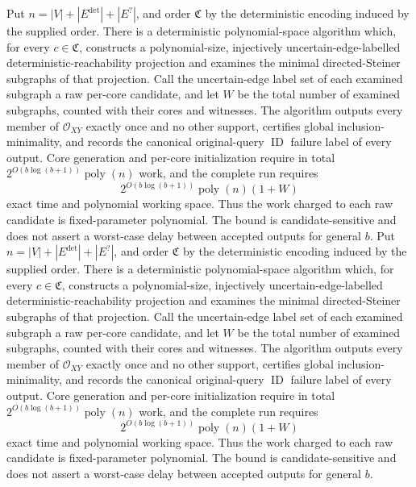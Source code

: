 Put \(n=|V|+|E^{\mathrm{det}}|+|E^{?}|\), and order \(\mathfrak C\) by the deterministic encoding induced by the supplied order.  There is a deterministic polynomial-space algorithm which, for every \(c\in\mathfrak C\), constructs a polynomial-size, injectively uncertain-edge-labelled deterministic-reachability projection and examines the minimal directed-Steiner subgraphs of that projection.  Call the uncertain-edge label set of each examined subgraph a raw per-core candidate, and let \(W\) be the total number of examined subgraphs, counted with their cores and witnesses.  The algorithm outputs every member of \(\mathcal O_{XY}\) exactly once and no other support, certifies global inclusion-minimality, and records the canonical original-query \(\operatorname{ID}\) failure label of every output.  Core generation and per-core initialization require in total \(2^{O(b\log(b+1))}\operatorname{poly}(n)\) work, and the complete run requires
\[
 2^{O(b\log(b+1))}\operatorname{poly}(n)(1+W)
\]
exact time and polynomial working space.  Thus the work charged to each raw candidate is fixed-parameter polynomial.  The bound is candidate-sensitive and does not assert a worst-case delay between accepted outputs for general \(b\).
Put \(n=|V|+|E^{\mathrm{det}}|+|E^{?}|\), and order \(\mathfrak C\) by the deterministic encoding induced by the supplied order.  There is a deterministic polynomial-space algorithm which, for every \(c\in\mathfrak C\), constructs a polynomial-size, injectively uncertain-edge-labelled deterministic-reachability projection and examines the minimal directed-Steiner subgraphs of that projection.  Call the uncertain-edge label set of each examined subgraph a raw per-core candidate, and let \(W\) be the total number of examined subgraphs, counted with their cores and witnesses.  The algorithm outputs every member of \(\mathcal O_{XY}\) exactly once and no other support, certifies global inclusion-minimality, and records the canonical original-query \(\operatorname{ID}\) failure label of every output.  Core generation and per-core initialization require in total \(2^{O(b\log(b+1))}\operatorname{poly}(n)\) work, and the complete run requires
\[
 2^{O(b\log(b+1))}\operatorname{poly}(n)(1+W)
\]
exact time and polynomial working space.  Thus the work charged to each raw candidate is fixed-parameter polynomial.  The bound is candidate-sensitive and does not assert a worst-case delay between accepted outputs for general \(b\).
